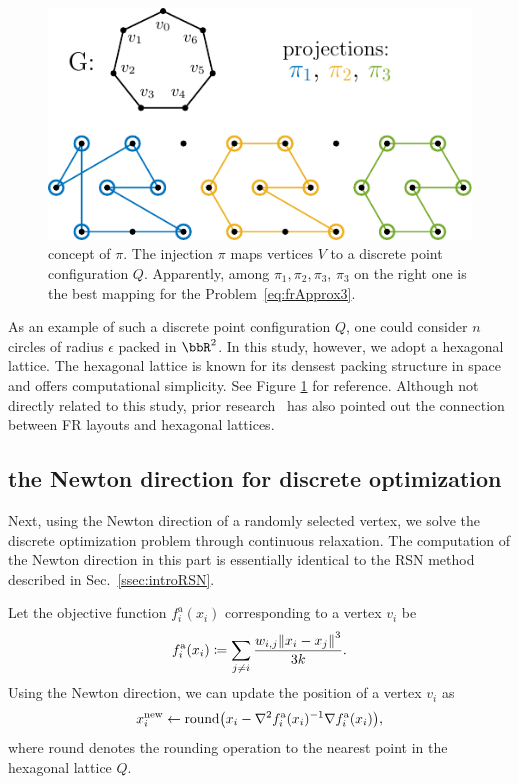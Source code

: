 \documentclass[dvipdfmx,journal]{IEEEtran}
\newcommand{\defeq}{\coloneqq}
\begin{document}
\begin{figure}[t]
  \centering
  \includegraphics[width=\columnwidth]{pi/pi.pdf}
  \caption{
    concept of $\pi$.
    The injection $\pi$ maps vertices $V$ to a discrete point configuration $Q$.
    Apparently, among $\pi_1, \pi_2, \pi_3$, $\pi_3$ on the right one is the best mapping for the Problem~\eqref{eq:frApprox3}.
  }
  \label{fig:pi}
\end{figure}

As an example of such a discrete point configuration $Q$, one could consider $n$ circles of radius $\epsilon$ packed in $\bbR^2$.
In this study, however, we adopt a hexagonal lattice.
The hexagonal lattice is known for its densest packing structure in space and offers computational simplicity.
See Figure \ref{fig:pi} for reference.
Although not directly related to this study, prior research~\cite{s22145179} has also pointed out the connection between FR layouts and hexagonal lattices.

\subsection{the Newton direction for discrete optimization}\label{ssec:newtonDirection}

Next, using the Newton direction of a randomly selected vertex, we solve the discrete optimization problem through continuous relaxation. The computation of the Newton direction in this part is essentially identical to the RSN method described in Sec.~\ref{ssec:introRSN}.

Let the objective function $f^{\mathrm{a}}_i(x_i)$ corresponding to a vertex $v_i$ be
\begin{equation*}
  f^{\mathrm{a}}_i(x_i) \defeq \sum_{j \neq i} \frac{w_{i,j}\norm{x_i - x_j}^3}{3k}.
\end{equation*}
Using the Newton direction, we can update the position of a vertex $v_i$ as
\begin{equation*}
  x_i^\mathrm{new} \gets \mathrm{round}\qty(x_i - \nabla^2 f^{\mathrm{a}}_i(x_i)^{-1} \nabla f^{\mathrm{a}}_i(x_i)),
\end{equation*}
where $\mathrm{round}$ denotes the rounding operation to the nearest point in the hexagonal lattice $Q$.
\end{document}
